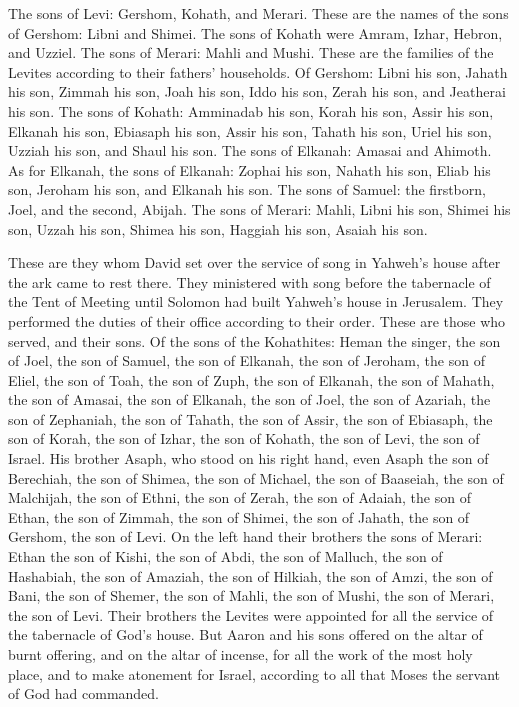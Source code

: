  The sons of Levi: Gershom, Kohath, and Merari.
 These are the names of the sons of Gershom: Libni and
Shimei.  The sons of Kohath were Amram, Izhar, Hebron, and
Uzziel.  The sons of Merari: Mahli and Mushi. These are the
families of the Levites according to their fathers' households.
 Of Gershom: Libni his son, Jahath his son, Zimmah his son,
 Joah his son, Iddo his son, Zerah his son, and Jeatherai
his son.  The sons of Kohath: Amminadab his son, Korah his
son, Assir his son,  Elkanah his son, Ebiasaph his son,
Assir his son,  Tahath his son, Uriel his son, Uzziah his
son, and Shaul his son.  The sons of Elkanah: Amasai and
Ahimoth.  As for Elkanah, the sons of Elkanah: Zophai his
son, Nahath his son,  Eliab his son, Jeroham his son, and
Elkanah his son.  The sons of Samuel: the firstborn, Joel,
and the second, Abijah.  The sons of Merari: Mahli, Libni
his son, Shimei his son, Uzzah his son,  Shimea his son,
Haggiah his son, Asaiah his son.

 These are they whom David set over the service of song in
Yahweh's house after the ark came to rest there.  They
ministered with song before the tabernacle of the Tent of Meeting until
Solomon had built Yahweh's house in Jerusalem. They performed the duties
of their office according to their order.  These are those
who served, and their sons. Of the sons of the Kohathites: Heman the
singer, the son of Joel, the son of Samuel,  the son of
Elkanah, the son of Jeroham, the son of Eliel, the son of Toah,
 the son of Zuph, the son of Elkanah, the son of Mahath,
the son of Amasai,  the son of Elkanah, the son of Joel,
the son of Azariah, the son of Zephaniah,  the son of
Tahath, the son of Assir, the son of Ebiasaph, the son of Korah,
 the son of Izhar, the son of Kohath, the son of Levi, the
son of Israel.  His brother Asaph, who stood on his right
hand, even Asaph the son of Berechiah, the son of Shimea, 
the son of Michael, the son of Baaseiah, the son of Malchijah,
 the son of Ethni, the son of Zerah, the son of Adaiah,
 the son of Ethan, the son of Zimmah, the son of Shimei,
 the son of Jahath, the son of Gershom, the son of Levi.
 On the left hand their brothers the sons of Merari: Ethan
the son of Kishi, the son of Abdi, the son of Malluch,  the
son of Hashabiah, the son of Amaziah, the son of Hilkiah, 
the son of Amzi, the son of Bani, the son of Shemer,  the
son of Mahli, the son of Mushi, the son of Merari, the son of Levi.
 Their brothers the Levites were appointed for all the
service of the tabernacle of God's house.  But Aaron and
his sons offered on the altar of burnt offering, and on the altar of
incense, for all the work of the most holy place, and to make atonement
for Israel, according to all that Moses the servant of God had
commanded.

